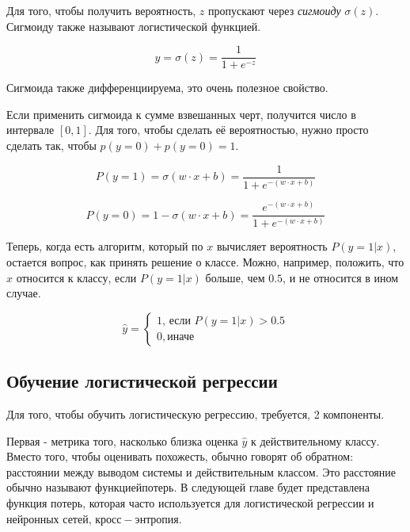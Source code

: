 \documentclass[a4paper,12pt,preview]{report} %
\begin{document}
	Для того, чтобы получить вероятность, $z$ пропускают через \textit{сигмоиду} $\sigma (z)$. Сигмоиду также называют логистической функцией.
	
	\begin{equation}
	y = \sigma (z) = \dfrac{1}{1 + e^{-z}}
	\end{equation}
	
	
	Сигмоида также дифференциируема, это очень полезное свойство. 
	
	Если применить сигмоида к сумме взвешанных черт, получится число в интервале $[0, 1]$. Для того, чтобы сделать её вероятностью, нужно просто сделать так, чтобы $p(y = 0) + p(y = 0) = 1$.
	
	\begin{equation}
	P(y = 1) = \sigma(w \cdot x + b) = \dfrac{1}{1 + e^{-(w \cdot x + b)}}
	\end{equation}
	
	\begin{equation}
	P(y = 0) = 1 - \sigma(w \cdot x + b) = \dfrac{e^{-(w \cdot x + b)}}{1 + e^{-(w \cdot x + b)}}
	\end{equation}
	 
	 Теперь, когда есть алгоритм, который по $x$ вычисляет вероятность $P(y = 1 | x)$, остается вопрос, как принять решение о классе. Можно, например, положить, что $x$ относится к классу, если $P(y = 1 | x)$ больше, чем $0.5$, и не относится в ином случае.
	 
	 \begin{equation}
	 \hat{y} = 
	 \begin{cases}
	 1 \textit{, если } P(y = 1 | x) > 0.5 \\
	 0, \textit{иначе}
	 \end{cases}
	 \end{equation}
	 
	 \subsection{Обучение логистической регрессии}
	 
	 Для того, чтобы обучить логистическую регрессию, требуется, 2 компоненты. 
	 
	 Первая - метрика того, насколько близка оценка $\hat{y}$ к действительному классу. Вместо того, чтобы оценивать похожесть, обычно говорят об обратном: расстоянии между выводом системы и действительным классом. Это расстояние обычно называют $функцией потерь$. В следующей главе будет представлена функция потерь, которая часто используется для логистической регрессии и нейронных сетей, $кросс-энтропия$. 
	 
\end{document}
